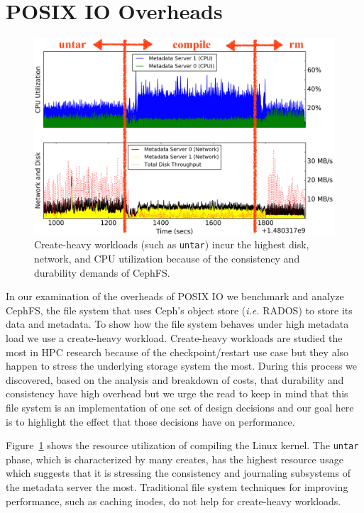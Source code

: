 \section{POSIX IO Overheads}
\label{sec:posix-overheads}

\begin{figure}[tb]
\centering
\includegraphics[width=1\linewidth]{./graphs/overhead-creates.png}
\caption{Create-heavy workloads (such as \texttt{untar}) incur the highest disk, network, and
CPU utilization because of the consistency and durability demands of
CephFS.}\label{fig:overhead-creates}
\end{figure}

In our examination of the overheads of POSIX IO we benchmark and analyze CephFS,
the file system that uses Ceph's object store ({\it i.e.} RADOS) to store its
data and metadata. To show how the file system behaves under high metadata load
we use a create-heavy workload. Create-heavy workloads are studied the most in
HPC research because of the checkpoint/restart use case but they also happen to
stress the underlying storage system the most.  During this process we
discovered, based on the analysis and breakdown of costs, that durability and
consistency have high overhead but we urge the read to keep in mind that this
file system is an implementation of one set of design decisions and our goal
here is to highlight the effect that those decisions have on performance.

Figure~\ref{fig:overhead-creates} shows the resource utilization of compiling
the Linux kernel.  The \texttt{untar} phase, which is characterized by many
creates, has the highest resource usage which suggests that it is stressing the
consistency and journaling subsystems of the metadata server the most.
Traditional file system techniques for improving performance, such as caching
inodes, do not help for create-heavy workloads.

